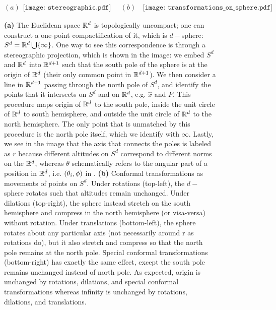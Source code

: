 \begin{figure}
	\centering 
	$(a)\begin{aligned}
		\texttt{[image: stereographic.pdf]}
	\end{aligned}\quad 
	(b)\;\;
	\begin{aligned}
		\texttt{[image: transformations\_on\_sphere.pdf]}
	\end{aligned}$	
	\caption[Conformal transformations on $S^n$]{\label{fig: conformal transformations on Sn}\textbf{(a)} The Euclidean space $\mathbb{R}^d$ is topologically uncompact; one can construct a one-point compactification of it, which is $d-$sphere: $S^d=\mathbb{R}^d\bigcup\{\infty\}$. One way to see this correspondence is through a stereographic projection, which is shown in the image: we embed $S^d$ and $\mathbb{R}^d$ into $\mathbb{R}^{d+1}$ such that the south pole of the sphere is at the origin of $\mathbb{R}^d$ (their only common point in $\mathbb{R}^{d+1}$). We then consider a line in $\mathbb{R}^{d+1}$ passing through the north pole of $S^d$, and identify the points that it intersects on $S^d$ and on $\mathbb{R}^d$, e.g. $\hat{x}$ and $P$. This procedure maps origin of $\mathbb{R}^d$ to the south pole, inside the unit circle of $\mathbb{R}^d$ to south hemisphere, and outside the unit circle of $\mathbb{R}^d$ to the north hemisphere. The only point that is unmatched by this procedure is the north pole itself, which we identify with $\infty$. Lastly, we see in the image that the axis that connects the poles is labeled as $r$ because different altitudes on $S^d$ correspond to different norms on the $\mathbb{R}^d$, whereas $\theta$ schematically refers to the angular part of a position in $\mathbb{R}^d$, i.e. $(\theta_i,\phi)$ in . \textbf{(b)} Conformal transformations as movements of points on $S^d$. Under rotations (top-left), the $d-$sphere rotates such that altitudes remain unchanged. Under dilations (top-right), the sphere instead stretch on the south hemisphere and compress in the north hemisphere (or visa-versa) without rotation. Under translations (bottom-left), the sphere rotates about any particular axis (not necessarily around r as rotations do), but it also stretch and compress so that the north pole remains at the north pole. Special conformal transformations (bottom-right) has exactly the same effect, except the south pole remains unchanged instead of north pole. As expected, origin is unchanged by rotations, dilations, and special conformal transformations whereas infinity is unchanged by rotations, dilations, and translations.}
\end{figure}

